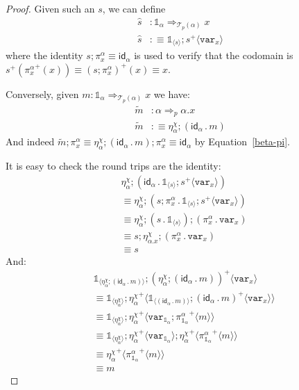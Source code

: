 \documentclass[10pt]{article}
\theoremstyle{definition}
\newcommand{\tcell}{\Rightarrow}
\newcommand{\id}{\mathsf{id}}
\newcommand\TrPlus[2]{\ensuremath{{#1}^+(#2)}}
\newcommand\El[2]{\mathcal{T}_{#1}(#2)}
\newcommand\bdot[0]{\mathbin{.}}
\newcommand\ApPlus[2]{\ensuremath{{#1}^+ \langle #2 \rangle }}
\newcommand\One{\ensuremath{\mathds{1}}}
\newcommand\var[1]{\ensuremath{\mathtt{var}_{#1}}}
\newcommand\ApOne[1]{\ensuremath{\One_{\langle {#1} \rangle }}}
\begin{document}
\begin{proof}
Given such an $s$, we can define
\begin{align*}
\hat{s} &: \One_\alpha \tcell_{\El{p}{\alpha}} x \\
\hat{s} &:\equiv \ApOne{s};\ApPlus{s}{\var{x}}
\end{align*}
where the identity $s;\pi^\alpha_x \equiv \id_\alpha$ is used to verify that the codomain is $\TrPlus{s}{\TrPlus{\pi^\alpha_x}{x}} \equiv \TrPlus{(s;\pi^\alpha_x)}{x} \equiv x$.

Conversely, given $m : \One_\alpha \tcell_{\El{p}{\alpha}} x$ we have:
\begin{align*}
\tilde{m} &: \alpha \tcell_p \alpha.x \\
\tilde{m} &:\equiv \eta^\chi_\alpha ; (\id_\alpha \bdot m)
\end{align*}
And indeed $\tilde{m};\pi^\alpha_x \equiv \eta^\chi_\alpha ; (\id_\alpha \bdot m);\pi^\alpha_x \equiv \id_\alpha$ by Equation~\eqref{beta-pi}.

It is easy to check the round trips are the identity:
\begin{align*}
&\eta^\chi_\alpha ; (\id_\alpha \bdot \ApOne{s};\ApPlus{s}{\var{x}}) \\
&\equiv \eta^\chi_\alpha ; (s;\pi^\alpha_x \bdot \ApOne{s};\ApPlus{s}{\var{x}}) \\
&\equiv \eta^\chi_\alpha ; (s \bdot \ApOne{s});(\pi^\alpha_x \bdot \var{x}) \\
&\equiv s;\eta^\chi_{\alpha.x} ; (\pi^\alpha_x \bdot \var{x}) \\
&\equiv s
\end{align*}
And:
\begin{align*}
&\ApOne{\eta^\chi_\alpha ; (\id_\alpha \bdot m)};\ApPlus{(\eta^\chi_\alpha ; (\id_\alpha \bdot m))}{\var{x}} \\
&\equiv \ApOne{\eta^\chi_\alpha};\ApPlus{\eta^\chi_\alpha}{\ApOne{(\id_\alpha \bdot m)};\ApPlus{(\id_\alpha \bdot m)}{\var{x}}} \\
&\equiv \ApOne{\eta^\chi_\alpha};\ApPlus{\eta^\chi_\alpha}{\var{\One_\alpha};\ApPlus{\pi^\alpha_{\One_\alpha}}{m}} \\
&\equiv \ApOne{\eta^\chi_\alpha};\ApPlus{\eta^\chi_\alpha}{\var{\One_\alpha}};\ApPlus{\eta^\chi_\alpha}{\ApPlus{\pi^\alpha_{\One_\alpha}}{m}} \\
&\equiv \ApPlus{\eta^\chi_\alpha}{\ApPlus{\pi^\alpha_{\One_\alpha}}{m}} \\
&\equiv m
\end{align*}
\end{proof}
\end{document}
